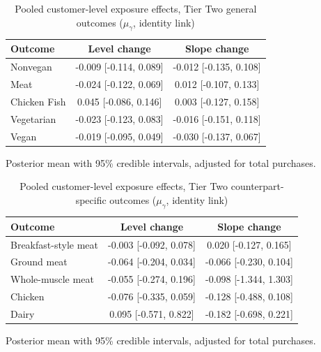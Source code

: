 \begin{table}[H]
\centering
\caption{Pooled customer-level exposure effects, Tier Two general outcomes ($\mu_\gamma$, identity link)}
\label{tab:t2_a5_mu_gamma}
\begin{tabular}{lcc}
\toprule
Outcome & Level change & Slope change \\
\midrule
Nonvegan & -0.009 [-0.114, 0.089] & -0.012 [-0.135, 0.108] \\
Meat & -0.024 [-0.122, 0.069] & 0.012 [-0.107, 0.133] \\
Chicken Fish & 0.045 [-0.086, 0.146] & 0.003 [-0.127, 0.158] \\
Vegetarian & -0.023 [-0.123, 0.083] & -0.016 [-0.151, 0.118] \\
Vegan & -0.019 [-0.095, 0.049] & -0.030 [-0.137, 0.067] \\
\bottomrule
\end{tabular}
\par\smallskip\footnotesize Posterior mean with 95\% credible intervals, adjusted for total purchases.
\end{table}

\begin{table}[H]
\centering
\caption{Pooled customer-level exposure effects, Tier Two counterpart-specific outcomes ($\mu_\gamma$, identity link)}
\label{tab:t2_a6_mu_gamma}
\begin{tabular}{lcc}
\toprule
Outcome & Level change & Slope change \\
\midrule
Breakfast-style meat & -0.003 [-0.092, 0.078] & 0.020 [-0.127, 0.165] \\
Ground meat & -0.064 [-0.204, 0.034] & -0.066 [-0.230, 0.104] \\
Whole-muscle meat & -0.055 [-0.274, 0.196] & -0.098 [-1.344, 1.303] \\
Chicken & -0.076 [-0.335, 0.059] & -0.128 [-0.488, 0.108] \\
Dairy & 0.095 [-0.571, 0.822] & -0.182 [-0.698, 0.221] \\
\bottomrule
\end{tabular}
\par\smallskip\footnotesize Posterior mean with 95\% credible intervals, adjusted for total purchases.
\end{table}


